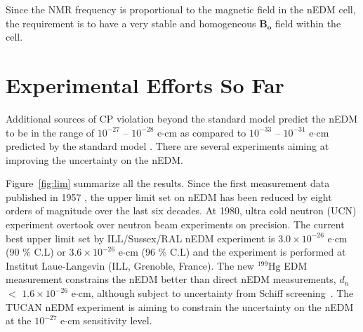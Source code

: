 Since the NMR frequency is proportional to the magnetic field in the nEDM cell, the requirement is to have a very stable and homogeneous $\bm{B_o}$ field within the cell.


\section{Experimental Efforts So Far}\label{sec:lim}

Additional sources of CP violation beyond the standard model predict the nEDM to be in the range of $10^{-27}$ -- $10^{-28}$  e$\cdot$cm as compared to $10^{-33}$ -- $10^{-31}$ e$\cdot$cm predicted by the standard model \cite{theory_lim_1, theory_lim_2, theory_lim_3}. There are several experiments aiming at improving the uncertainty on the nEDM. 


Figure~\ref{fig:lim} summarize all the results. Since the first measurement data published in 1957 \cite{1_lim}, the upper limit set on nEDM has been reduced by eight orders of magnitude over the last six decades. At 1980, ultra cold neutron (UCN) experiment overtook over neutron beam experiments on precision. The current best upper limit set by ILL/Sussex/RAL nEDM experiment is $3.0 \times 10^{-26}$ e$\cdot$cm (90 \% C.L) or $3.6 \times 10^{-26}$ e$\cdot$cm (96 \% C.L) \cite{bestLim_1,bestLim_2} and the experiment is performed at Institut Laue-Langevin (ILL, Grenoble, France). The new $^{199}\mathrm{Hg}$ EDM measurement constrains the nEDM better than direct nEDM measurements, $d_n$ $<$   $\mathrm{1.6\times10^{-26}}$ e$\cdot$cm, although subject to uncertainty from Schiff screening~\cite{schiff_screen}. The TUCAN nEDM experiment is aiming to constrain the uncertainty on the nEDM at the $10^{-27}$ e$\cdot$cm sensitivity level. 

